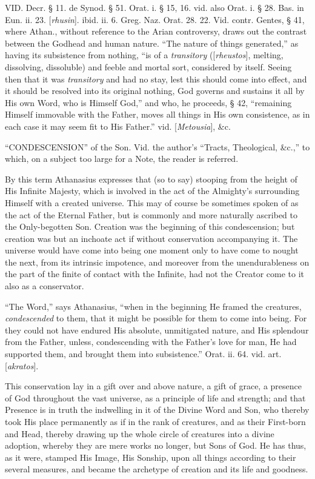 VID.
Decr. § 11. de Synod. § 51. Orat. i. § 15, 16. vid. also Orat. i.
§ 28. Bas. in Eun. ii. 23. [\emph{rhusin}]. ibid. ii. 6. Greg. Naz.
Orat. 28. 22. Vid. contr. Gentes, § 41, where Athan., without
reference to the Arian controversy, draws out the contrast between the
Godhead and human nature. ``The nature of things generated,'' as having
its subsistence from nothing, ``is of a \emph{transitory} ([\emph{rheustos}],
melting, dissolving, dissoluble) and feeble and mortal sort,
considered by itself. Seeing then that it was \emph{transitory} and
had no stay, lest this should come into effect, and it should be
resolved into its original nothing, God governs and sustains it all by
His own Word, who is Himself God,'' and who, he proceeds, § 42, ``remaining
Himself immovable with the Father, moves all things in His own
consistence, as in each case it may seem fit to His Father.'' vid. [\emph{Metousia}],
\&c.

\xsection{[Sunkatabasis]}

``CONDESCENSION''
of the Son. Vid. the author's ``Tracts, Theological, \&c.,'' to
which, on a subject too large for a Note, the reader is referred.

By this term Athanasius expresses that (so to
say) stooping from the height of His Infinite Majesty, which is
involved in the act of the Almighty's surrounding Himself with a
created universe. This may of course be sometimes spoken of as the act
of the Eternal Father, but is commonly and more naturally ascribed to
the Only-begotten Son. Creation was the beginning of this
condescension; but creation was but an inchoate act if without
conservation accompanying it. The universe would have come into being
one moment only to have come to nought the next, from its intrinsic
impotence, and moreover from the unendurableness on the part of the
finite of contact with the Infinite, had not the Creator come to it
also as a conservator.

``The Word,'' says Athanasius, ``when in the
beginning He framed the creatures, \emph{condescended} to them, that
it might be possible for them to come into being. For they could not
have endured His absolute, unmitigated nature, and His splendour from
the Father, unless, condescending with the Father's love for man, He
had supported them, and brought them into subsistence.'' Orat. ii. 64.
vid. art. [\emph{akratos}].

This conservation lay in a gift over and above
nature, a gift of grace, a presence of God throughout the vast
universe, as a principle of life and strength; and that Presence is in
truth the indwelling in it of the Divine Word and Son, who thereby
took His place permanently as if in the rank of creatures, and as
their First-born and Head, thereby drawing up the whole circle of
creatures into a divine adoption, whereby they are mere works no
longer, but Sons of God. He has thus, as it were, stamped His Image,
His Sonship, upon all things according to their several measures, and
became the archetype of creation and its life and goodness.

